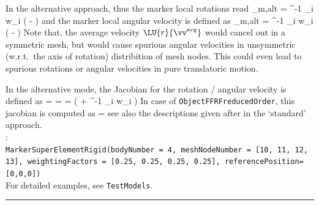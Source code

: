     In the alternative approach, thus the marker local rotations read
    \be
      _{m,alt} = \Wm^{-1} \sum_i w_i  \left(  -  \right) \eqComma
    \ee
    and the marker local angular velocity is defined as
    \be
      _{m,alt} = \Wm^{-1} \sum_i w_i  \left(  -  \right) \eqDot
    \ee
    Note that, the average velocity $\LU{r}{\vv^\mathrm{avg}}$ would cancel out in a symmetric mesh, but would cause spurious 
    angular velocities in unsymmetric (w.r.t.\ the axis of rotation) distribition of mesh nodes. 
    This could even lead to spurious rotations or angular velocities in pure translatoric motion.

    In the alternative mode, the Jacobian for the rotation / angular velocity is defined as
    \be
       = 
                  = 
                  =  \left(  + 
                                        \Wm^{-1} \sum_i w_i  \right)
    \ee
    In case of \texttt{ObjectFFRFreducedOrder}, this jacobian is computed as
    \be
       = 
    \ee
    see also the descriptions given after  in the `standard' approach.
    \vspace{12pt}\\
    :\vspace{6pt}\\
    \texttt{MarkerSuperElementRigid(bodyNumber = 4, meshNodeNumber = [10, 11, 12, 13], weightingFactors = [0.25, 0.25, 0.25, 0.25], referencePosition=[0,0,0])}
    \vspace{12pt}\\
    \noindent For detailed examples, see \texttt{TestModels}.
\vspace{6pt}\par\noindent\rule{\textwidth}{0.4pt}
